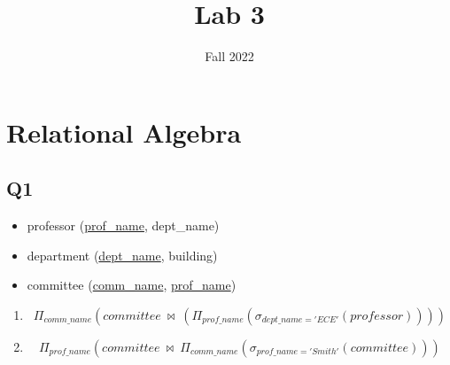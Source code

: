 \documentclass{homework}
\author{}
\date{Fall 2022}
\title{Lab 3}
\begin{document}
 \maketitle

\section{Relational Algebra}


\subsection*{Q1}
\begin{itemize}[label=]
    \item professor (\underline{prof\_name}, dept\_name)
    \item department (\underline{dept\_name}, building)
    \item committee (\underline{comm\_name}, \underline{prof\_name})
\end{itemize}

\begin{enumerate}[label=\alph*)]
    \item
    \[\Pi _{comm\_name}\left(committee\:\bowtie \:\left(\Pi _{prof\_name}\left(\sigma _{dept\_name='ECE'}\left(professor\right)\right)\right)\right)\]
    \item 
    \[\Pi _{prof\_name}\left(committee\:\bowtie \:\Pi _{comm\_name}\left(\sigma _{prof\_name='Smith'}\left(committee\right)\right)\right)\]
\end{enumerate}
\end{document}
